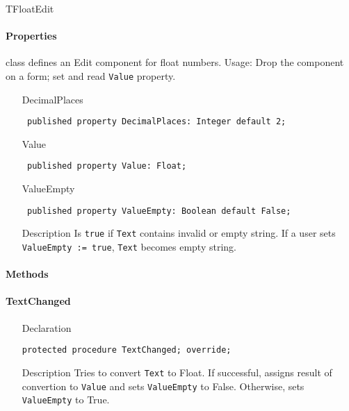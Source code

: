 \documentclass[12pt,a4paper,oneside]{report}
\newcommand{\declarationitem}[1]{{\addfontfeatures{FakeBold=1.3} #1}}
\newcommand{\descriptiontitle}[1]{{\addfontfeatures{FakeSlant}#1}}
\newcommand{\code}[1]{\texttt{#1}}
\begin{document}
TFloatEdit\paragraph{Properties}\hspace*{\fill} class defines an Edit component for float numbers. Usage: Drop the component on a form; set and read \code{Value} property. 
\begin{itemize}\label{lmnumericedits.TFloatEdit-DecimalPlaces}
\item[\declarationitem{DecimalPlaces}\hfill]
\begin{flushleft}
\code{
published property DecimalPlaces: Integer default 2;}
\end{flushleft}
\label{lmnumericedits.TFloatEdit-Value}
\item[\declarationitem{Value}\hfill]
\begin{flushleft}
\code{
published property Value: Float;}
\end{flushleft}
\label{lmnumericedits.TFloatEdit-ValueEmpty}
\item[\declarationitem{ValueEmpty}\hfill]
\begin{flushleft}
\code{
published property ValueEmpty: Boolean default False;}
\end{flushleft}
\item[\descriptiontitle{Description}]
Is \code{true} if \code{Text} contains invalid or empty string. If a user sets \code{ValueEmpty := true}, \code{Text} becomes empty string.
\end{itemize}
\paragraph{Methods}\hspace*{\fill}

\paragraph{TextChanged}\hspace*{\fill}

\label{lmnumericedits.TFloatEdit-TextChanged}
\begin{itemize}\item[\declarationitem{Declaration}\hfill]
\begin{flushleft}
\code{protected procedure TextChanged; override;}
\end{flushleft}
\item[\descriptiontitle{Description}] Tries to convert \code{Text} to Float. If successful, assigns result of convertion to \code{Value} and sets \code{ValueEmpty} to False. Otherwise, sets \code{ValueEmpty} to True.
\end{itemize}
\end{document}
